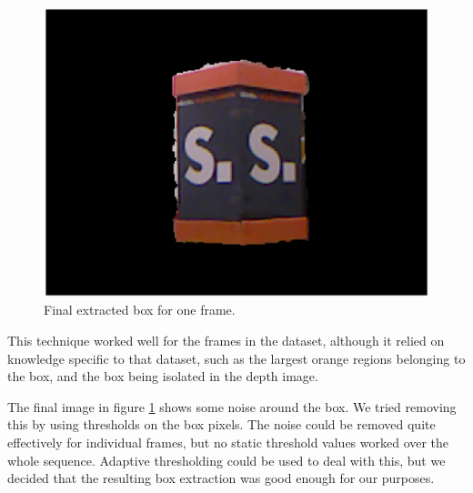 \documentclass[12pt,a4paper,onecolumn]{article}
\begin{document}
\begin{figure}[!ht]
  \centering
  \includegraphics[width=1.0\textwidth]{figs/extracted_box_example}
  \caption{Final extracted box for one frame.}
  \label{fig:extracted_box_example}
\end{figure}

This technique worked well for the frames in the dataset, although it relied on knowledge specific to that dataset, such as the largest orange regions belonging to the box, and the box being isolated in the depth image.

The final image in figure \ref{fig:extracted_box_example} shows some noise around the box.  We tried removing this by using thresholds on the box pixels.  The noise could be removed quite effectively for individual frames, but no static threshold values worked over the whole sequence.  Adaptive thresholding could be used to deal with this, but we decided that the resulting box extraction was good enough for our purposes.
\end{document}
